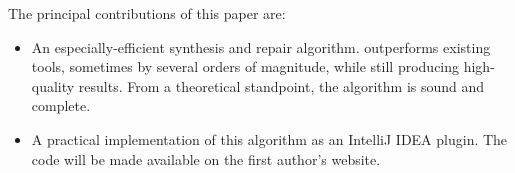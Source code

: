 The principal contributions of this paper are:
\begin{itemize}\itemsep0pt
	\item An especially-efficient synthesis and repair algorithm. \ourTool outperforms existing tools, sometimes by several orders of magnitude, while still producing high-quality results. From a theoretical standpoint, the \ourTool algorithm is sound and complete.
	\item A practical implementation of this algorithm as an IntelliJ IDEA plugin. The code will be made available on the first author's website.
\end{itemize}
